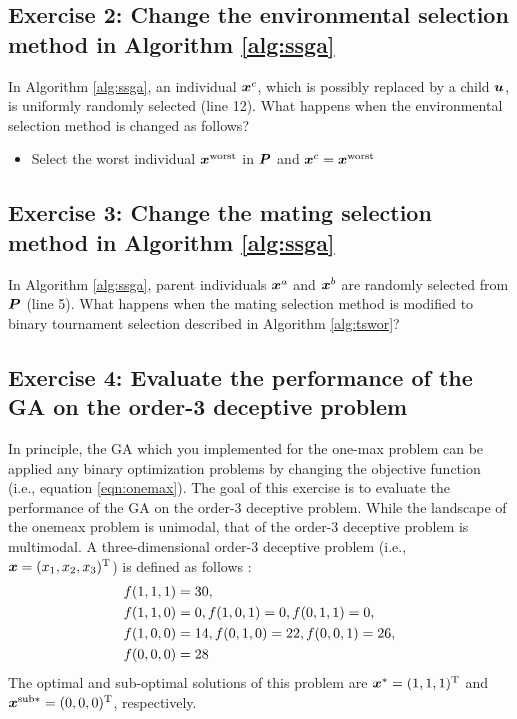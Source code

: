 \documentclass[11pt]{article}
\def\vector#1{\mbox{\boldmath $#1$}}
\def\vector#1{\mbox{\boldmath $#1$}}
\begin{document}

\subsection{Exercise 2: Change the environmental selection method in Algorithm \ref{alg:ssga}}

In Algorithm \ref{alg:ssga}, an individual $\vector{x}^c$, which is possibly replaced by a child $\vector{u}$, is uniformly randomly selected (line 12).
What happens when the environmental selection method is changed as follows?
%
\begin{itemize}
\item Select the worst individual $\vector{x}^{\rm worst}$ in $\vector{P}$ and $\vector{x}^{c} = \vector{x}^{\rm worst}$
\end{itemize}

\subsection{Exercise 3: Change the mating selection method in Algorithm \ref{alg:ssga}}

In Algorithm \ref{alg:ssga}, parent individuals $\vector{x}^a$ and $\vector{x}^b$ are randomly selected from $\vector{P}$ (line 5).
What happens when the mating selection method is modified to binary tournament selection described in Algorithm \ref{alg:tswor}?


\subsection{Exercise 4: Evaluate the performance of the GA on the order-3 deceptive problem}

In principle, the GA which you implemented for the one-max problem can be applied any binary optimization problems by changing the objective function (i.e., equation \eqref{eqn:onemax}).
The goal of this exercise is to evaluate  the performance of the GA on the order-3 deceptive problem.
While the landscape of the onemeax problem is unimodal, that of the order-3 deceptive problem is multimodal.
A three-dimensional order-3 deceptive problem (i.e., $\vector{x} = (x_1, x_2, x_3)^{\rm T}$) is defined as follows \cite{LiOH11}:
%
\begin{align}
\label{eqn:3order}
&f(1, 1, 1) = 30,\\\notag
&f(1, 1, 0) = 0, f(1, 0, 1) = 0, f(0, 1, 1) = 0,\\\notag
&f(1, 0, 0) = 14,  f(0, 1, 0) = 22, f(0, 0, 1) = 26,\\\notag
&f(0, 0, 0) = 28
\end{align}
%
The optimal and sub-optimal solutions of this problem are $\vector{x}^{*} = (1, 1, 1)^{\rm T}$ and $\vector{x}^{{\rm sub}*} = (0, 0, 0)^{\rm T}$, respectively.
\end{document}
